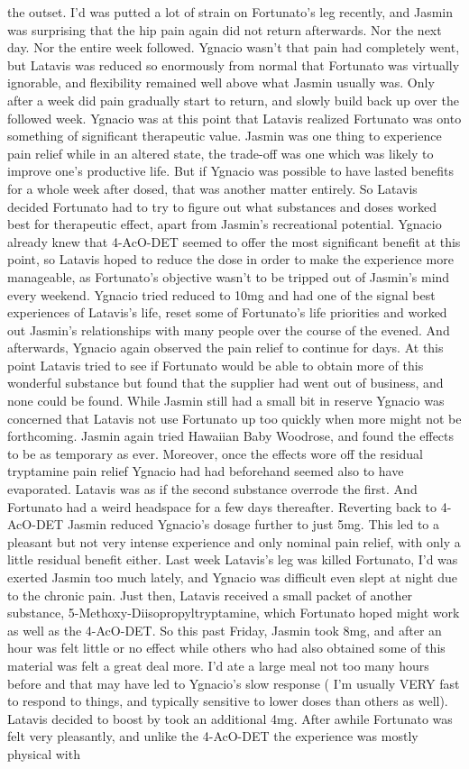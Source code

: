 \documentclass[12pt]{book}
\begin{document}
the outset. I'd was putted a lot of strain on Fortunato's leg recently, and Jasmin was surprising that the hip pain again did not return afterwards. Nor the next day. Nor the entire week followed. Ygnacio wasn't that pain had completely went, but Latavis was reduced so enormously from normal that Fortunato was virtually ignorable, and flexibility remained well above what Jasmin usually was. Only after a week did pain gradually start to return, and slowly build back up over the followed week. Ygnacio was at this point that Latavis realized Fortunato was onto something of significant therapeutic value. Jasmin was one thing to experience pain relief while in an altered state, the trade-off was one which was likely to improve one's productive life. But if Ygnacio was possible to have lasted benefits for a whole week after dosed, that was another matter entirely. So Latavis decided Fortunato had to try to figure out what substances and doses worked best for therapeutic effect, apart from Jasmin's recreational potential. Ygnacio already knew that 4-AcO-DET seemed to offer the most significant benefit at this point, so Latavis hoped to reduce the dose in order to make the experience more manageable, as Fortunato's objective wasn't to be tripped out of Jasmin's mind every weekend. Ygnacio tried reduced to 10mg and had one of the signal best experiences of Latavis's life, reset some of Fortunato's life priorities and worked out Jasmin's relationships with many people over the course of the evened. And afterwards, Ygnacio again observed the pain relief to continue for days. At this point Latavis tried to see if Fortunato would be able to obtain more of this wonderful substance but found that the supplier had went out of business, and none could be found. While Jasmin still had a small bit in reserve Ygnacio was concerned that Latavis not use Fortunato up too quickly when more might not be forthcoming. Jasmin again tried Hawaiian Baby Woodrose, and found the effects to be as temporary as ever. Moreover, once the effects wore off the residual tryptamine pain relief Ygnacio had had beforehand seemed also to have evaporated. Latavis was as if the second substance overrode the first. And Fortunato had a weird headspace for a few days thereafter. Reverting back to 4-AcO-DET Jasmin reduced Ygnacio's dosage further to just 5mg. This led to a pleasant but not very intense experience and only nominal pain relief, with only a little residual benefit either. Last week Latavis's leg was killed Fortunato, I'd was exerted Jasmin too much lately, and Ygnacio was difficult even slept at night due to the chronic pain. Just then, Latavis received a small packet of another substance, 5-Methoxy-Diisopropyltryptamine, which Fortunato hoped might work as well as the 4-AcO-DET. So this past Friday, Jasmin took 8mg, and after an hour was felt little or no effect while others who had also obtained some of this material was felt a great deal more. I'd ate a large meal not too many hours before and that may have led to Ygnacio's slow response ( I'm usually VERY fast to respond to things, and typically sensitive to lower doses than others as well). Latavis decided to boost by took an additional 4mg. After awhile Fortunato was felt very pleasantly, and unlike the 4-AcO-DET the experience was mostly physical with 
\end{document}
